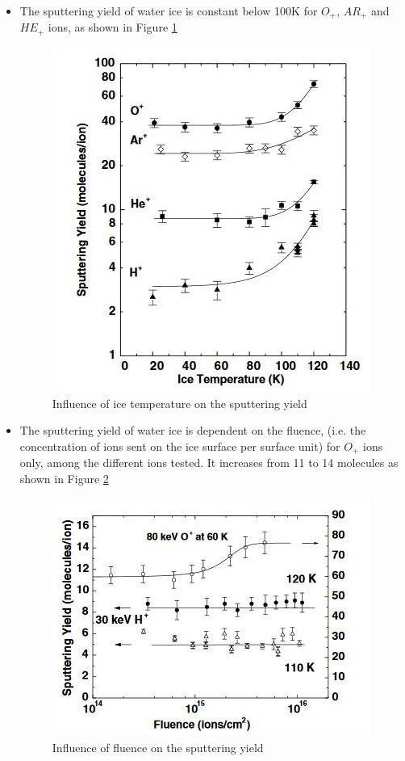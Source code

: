 \begin{itemize}
    \item {The sputtering yield of water ice is constant below 100K for $O_{+}$, $AR_{+}$ and $HE_{+}$ ions, as shown in Figure \ref{sputtering30kev}}
    
\begin{figure}[htb]
\begin{center}
\includegraphics{Paul/sputtering30kev.JPG}
\end{center}
\caption{Influence of ice temperature on the sputtering yield}
\label{sputtering30kev}
\end{figure}

    \item {The sputtering yield of water ice is dependent on the fluence, (i.e. the concentration of ions sent on the ice surface per surface unit) for $O_{+}$ ions only, among the different ions tested. It increases from 11 to 14 molecules as shown in Figure \ref{sputteringfluence}}
    
\begin{figure}[htb]
\begin{center}
\includegraphics{Paul/sputteringfluence.JPG}
\end{center}
\caption{Influence of fluence on the sputtering yield}
\label{sputteringfluence}
\end{figure}


\end{itemize}
